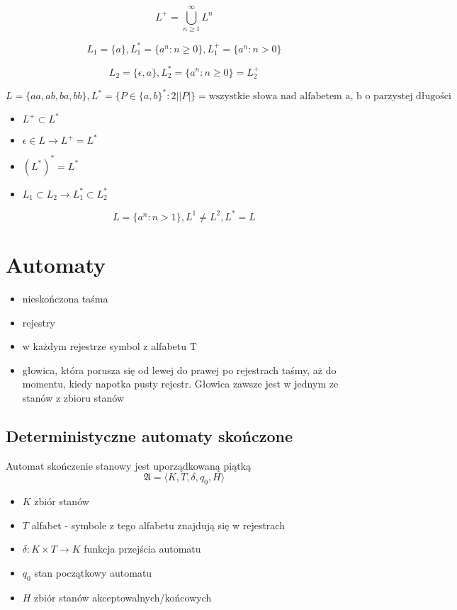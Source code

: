 \documentclass{../notatki}
\begin{document}
$$
L^+ = \bigcup_{n \ge 1}^{\infty}L^n
$$

$$
L_1 = \{a\}, L_1^* = \{a^n : n \ge 0\}, L_1^+ = \{a^n : n > 0\}
$$

$$
L_2 = \{\epsilon, a\}, L_2^* = \{a^n : n \ge 0\} = L_2^+
$$

$$
L = \{aa, ab, ba, bb\}, L^* = \{P \in \{a, b\}^* : 2 | |P|\} = \text{wszystkie słowa nad alfabetem {a, b} o parzystej długości}
$$

\begin{itemize}
    \item $L^+ \subset L^*$
    \item $\epsilon \in L \rightarrow L^+ = L^*$
    \item $(L^*)^* = L^*$
    \item $L_1 \subset L_2 \rightarrow L_1^* \subset L_2^*$
\end{itemize}

$$
L = \{a^n : n > 1\}, L^1 \ne L^2, L^* = L
$$

\section{Automaty}

\begin{itemize}
    \item nieskończona taśma
    \item rejestry
    \item w każdym rejestrze symbol z alfabetu T
    \item głowica, która porusza się od lewej do prawej po rejestrach taśmy, aż do momentu, kiedy napotka pusty rejestr. Głowica zawsze jest w jednym ze stanów z zbioru stanów
\end{itemize}

\subsection{Deterministyczne automaty skończone}

Automat skończenie stanowy jest uporządkowaną piątką 
$$
\mathfrak{A} = \langle K,T,\delta,q_0,H \rangle 
$$

\begin{itemize}
    \item $K$   zbiór stanów
    \item $T$   alfabet - symbole z tego alfabetu znajdują się w rejestrach
    \item $\delta: K \times T \rightarrow K$  funkcja przejścia automatu
    \item $q_0$ stan początkowy automatu
    \item $H$ zbiór stanów akceptowalnych/końcowych
\end{itemize}
\end{document}
